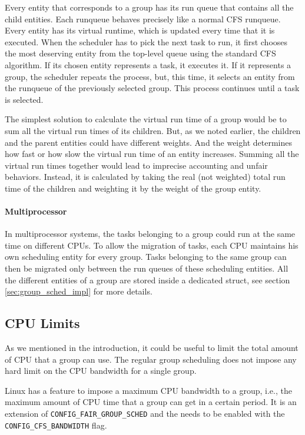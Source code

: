 Every entity that corresponds to a group has its run queue that contains all the child entities. Each runqueue behaves precisely like a normal CFS runqueue.  Every entity has its virtual runtime, which is updated every time that it is executed. When the scheduler has to pick the next task to run, it first chooses the most deserving entity from the top-level queue using the standard CFS algorithm. If its chosen entity represents a task, it executes it. If it represents a group, the scheduler repeats the process, but, this time, it selects an entity from the runqueue of the previously selected group. This process continues until a task is selected.

The simplest solution to calculate the virtual run time of a group would be to sum all the virtual run times of its children. But, as we noted earlier, the children and the parent entities could have different weights. And the weight determines how fast or how slow the virtual run time of an entity increases. Summing all the virtual run times together would lead to imprecise accounting and unfair behaviors. Instead, it is calculated by taking the real (not weighted) total run time of the children and weighting it by the weight of the group entity.

\paragraph{Multiprocessor}
In multiprocessor systems, the tasks belonging to a group could run at the same time on different CPUs. To allow the migration of tasks, each CPU maintains his own scheduling entity for every group. Tasks belonging to the same group can then be migrated only between the run queues of these scheduling entities. All the different entities of a group are stored inside a dedicated struct, see section \ref{sec:group_sched_impl} for more details.

\subsection{CPU Limits}%

As we mentioned in the introduction, it could be useful to limit the total amount of CPU that a group can use. The regular group scheduling does not impose any hard limit on the CPU bandwidth for a single group. 

Linux has a feature to impose a maximum CPU bandwidth to a group, i.e., the maximum amount of CPU time that a group can get in a certain period. It is an extension of \verb|CONFIG_FAIR_GROUP_SCHED| and the needs to be enabled with the \verb|CONFIG_CFS_BANDWIDTH| flag.


